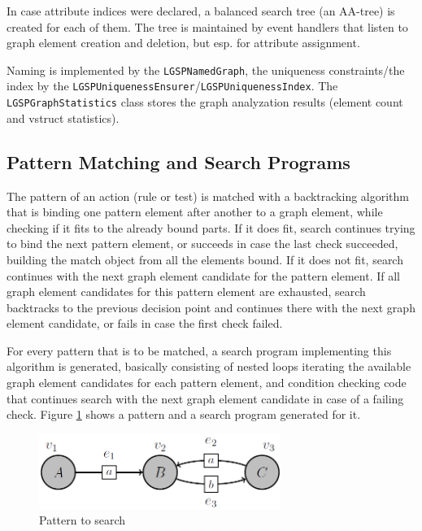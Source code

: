 In case attribute indices were declared, a balanced search tree (an AA-tree) is created for each of them.
The tree is maintained by event handlers that listen to graph element creation and deletion, but esp. for attribute assignment.

Naming is implemented by the \texttt{LGSPNamedGraph}, the uniqueness constraints/the index by the \texttt{LGSPUniquenessEnsurer}/\texttt{LGSPUniquenessIndex}.
The \texttt{LGSPGraphStatistics} class stores the graph analyzation results (element count and vstruct statistics).

\subsection*{Pattern Matching and Search Programs}

The pattern of an action (rule or test) is matched with a backtracking algorithm that is binding one pattern element after another to a graph element, while checking if it fits to the already bound parts. 
If it does fit, search continues trying to bind the next pattern element, 
or succeeds in case the last check succeeded, building the match object from all the elements bound.
If it does not fit, search continues with the next graph element candidate for the pattern element.
If all graph element candidates for this pattern element are exhausted, search backtracks to the previous decision point and continues there with the next graph element candidate, or fails in case the first check failed.

For every pattern that is to be matched, a search program implementing this algorithm is generated, basically consisting of nested loops iterating the available graph element candidates for each pattern element, and condition checking code that continues search with the next graph element candidate in case of a failing check.
Figure \ref{figpatterntosearchfirst} shows a pattern and a search program generated for it.

\begin{figure}[htbp]
  \centering
  \includegraphics[width=0.7\textwidth]{fig/Pattern}
  \caption{Pattern to search}
  \label{figpatterntosearchfirst}
\end{figure}

